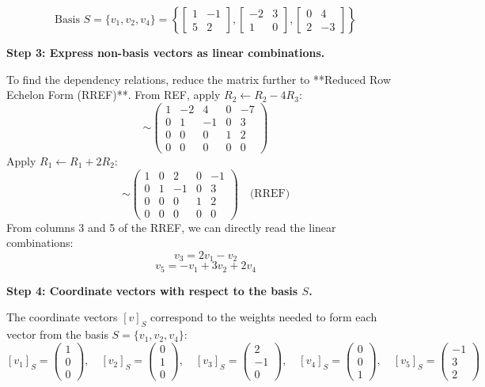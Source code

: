 \documentclass[12pt,a3paper]{article}
\begin{document}
\begin{tcolorbox}[enhanced,breakable,
  colback=cC!4,colframe=cC,boxrule=0.8pt,arc=5pt,
  title={\textbf{Answer --- Basis and Coordinates in $M_{22}$}},
  fonttitle=\bfseries\color{white},colbacktitle=cC]
\[
\boxed{\text{Basis } S = \{v_1, v_2, v_4\} = \left\{ \begin{bmatrix} 1 & -1 \\ 5 & 2 \end{bmatrix}, \begin{bmatrix} -2 & 3 \\ 1 & 0 \end{bmatrix}, \begin{bmatrix} 0 & 4 \\ 2 & -3 \end{bmatrix} \right\}}
\]

\medskip
\textbf{Step 3: Express non-basis vectors as linear combinations.}

To find the dependency relations, reduce the matrix further to **Reduced Row Echelon Form (RREF)**.
From REF, apply $R_2 \leftarrow R_2 - 4R_3$:
\[
\sim \begin{pmatrix}
1 & -2 & 4 & 0 & -7 \\
0 & 1 & -1 & 0 & 3 \\
0 & 0 & 0 & 1 & 2 \\
0 & 0 & 0 & 0 & 0
\end{pmatrix}
\]
Apply $R_1 \leftarrow R_1 + 2R_2$:
\[
\sim \begin{pmatrix}
1 & 0 & 2 & 0 & -1 \\
0 & 1 & -1 & 0 & 3 \\
0 & 0 & 0 & 1 & 2 \\
0 & 0 & 0 & 0 & 0
\end{pmatrix} \quad \text{(RREF)}
\]
From columns 3 and 5 of the RREF, we can directly read the linear combinations:
\[
\boxed{v_3 = 2v_1 - v_2}
\]
\[
\boxed{v_5 = -v_1 + 3v_2 + 2v_4}
\]

\medskip
\textbf{Step 4: Coordinate vectors with respect to the basis $S$.}

The coordinate vectors $[v]_S$ correspond to the weights needed to form each vector from the basis $S = \{v_1, v_2, v_4\}$:
\[
\boxed{
[v_1]_S = \begin{pmatrix} 1 \\ 0 \\ 0 \end{pmatrix}, \quad
[v_2]_S = \begin{pmatrix} 0 \\ 1 \\ 0 \end{pmatrix}, \quad
[v_3]_S = \begin{pmatrix} 2 \\ -1 \\ 0 \end{pmatrix}, \quad
[v_4]_S = \begin{pmatrix} 0 \\ 0 \\ 1 \end{pmatrix}, \quad
[v_5]_S = \begin{pmatrix} -1 \\ 3 \\ 2 \end{pmatrix}
}
\]


\end{tcolorbox}
\end{document}
